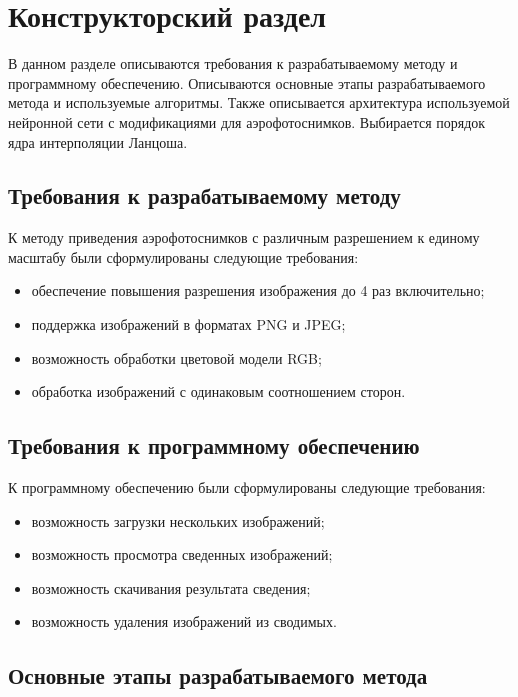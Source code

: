 \chapter{Конструкторский раздел}

В данном разделе описываются требования к разрабатываемому методу и программному обеспечению. Описываются основные этапы разрабатываемого метода и используемые алгоритмы. Также описывается архитектура используемой нейронной сети с модификациями для аэрофотоснимков. Выбирается порядок ядра интерполяции Ланцоша. 

\section{Требования к разрабатываемому методу}

К методу приведения аэрофотоснимков с различным разрешением к единому масштабу были сформулированы следующие требования:

\begin{itemize}[label=---]
    \item обеспечение повышения разрешения изображения до 4 раз включительно;
    \item поддержка изображений в форматах PNG и JPEG;
    \item возможность обработки цветовой модели RGB;
    \item обработка изображений с одинаковым соотношением сторон.
\end{itemize}

\section{Требования к программному обеспечению}

К программному обеспечению были сформулированы следующие требования:
\begin{itemize}[label=---]
    \item возможность загрузки нескольких изображений;
    \item возможность просмотра сведенных изображений;
    \item возможность скачивания результата сведения;
    \item возможность удаления изображений из сводимых. 
\end{itemize}

\section{Основные этапы разрабатываемого метода}

